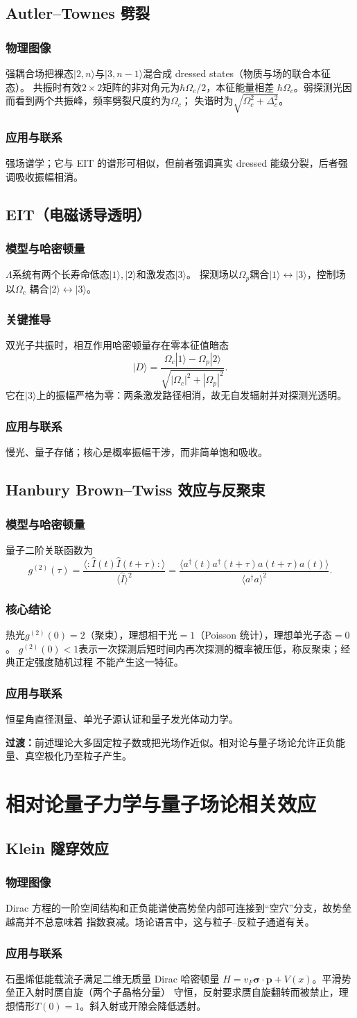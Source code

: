 \documentclass[12pt,a4paper,openany,fontset=fandol]{ctexrep}
\newcommand{\Physical}{\subsection*{物理图像}}
\newcommand{\Model}{\subsection*{模型与哈密顿量}}
\newcommand{\Derivation}{\subsection*{关键推导}}
\newcommand{\Conclusion}{\subsection*{核心结论}}
\newcommand{\Application}{\subsection*{应用与联系}}
\newcommand{\trans}[1]{\par\medskip\noindent\textcolor{blue!55!black}{\textbf{过渡：}}#1\par\medskip}
\begin{document}
\section{Autler--Townes 劈裂}
\Physical
强耦合场把裸态$|2,n\rangle$与$|3,n-1\rangle$混合成 dressed states（物质与场的联合本征态）。
共振时有效$2\times2$矩阵的非对角元为$\hbar\Omega_c/2$，本征能量相差
$\hbar\Omega_c$。弱探测光因而看到两个共振峰，频率劈裂尺度约为$\Omega_c$；
失谐时为$\sqrt{\Omega_c^2+\Delta_c^2}$。
\Application
强场谱学；它与 EIT 的谱形可相似，但前者强调真实 dressed 能级分裂，后者强调吸收振幅相消。

\section{EIT（电磁诱导透明）}
\Model
$\Lambda$系统有两个长寿命低态$|1\rangle,|2\rangle$和激发态$|3\rangle$。
探测场以$\Omega_p$耦合$|1\rangle\leftrightarrow|3\rangle$，控制场以$\Omega_c$
耦合$|2\rangle\leftrightarrow|3\rangle$。
\Derivation
双光子共振时，相互作用哈密顿量存在零本征值暗态
\begin{equation}|D\rangle=
\frac{\Omega_c|1\rangle-\Omega_p|2\rangle}
{\sqrt{|\Omega_c|^2+|\Omega_p|^2}}.\end{equation}
它在$|3\rangle$上的振幅严格为零：两条激发路径相消，故无自发辐射并对探测光透明。
\Application
慢光、量子存储；核心是概率振幅干涉，而非简单饱和吸收。

\section{Hanbury Brown--Twiss 效应与反聚束}
\Model
量子二阶关联函数为
\begin{equation}g^{(2)}(\tau)=
\frac{\langle:\hat I(t)\hat I(t+\tau):\rangle}{\langle\hat I\rangle^2}
=\frac{\langle a^\dagger(t)a^\dagger(t+\tau)a(t+\tau)a(t)\rangle}
{\langle a^\dagger a\rangle^2}.\end{equation}
\Conclusion
热光$g^{(2)}(0)=2$（聚束），理想相干光$=1$（Poisson 统计），理想单光子态$=0$。
$g^{(2)}(0)<1$表示一次探测后短时间内再次探测的概率被压低，称反聚束；经典正定强度随机过程
不能产生这一特征。
\Application
恒星角直径测量、单光子源认证和量子发光体动力学。
\trans{前述理论大多固定粒子数或把光场作近似。相对论与量子场论允许正负能量、真空极化乃至粒子产生。}

\chapter{相对论量子力学与量子场论相关效应}
\section{Klein 隧穿效应}
\Physical
Dirac 方程的一阶空间结构和正负能谱使高势垒内部可连接到“空穴”分支，故势垒越高并不总意味着
指数衰减。场论语言中，这与粒子--反粒子通道有关。
\Application
石墨烯低能载流子满足二维无质量 Dirac 哈密顿量
$H=v_F\bm\sigma\cdot\bm p+V(x)$。平滑势垒正入射时赝自旋（两个子晶格分量）
守恒，反射要求赝自旋翻转而被禁止，理想情形$T(0)=1$。斜入射或开隙会降低透射。
\end{document}
